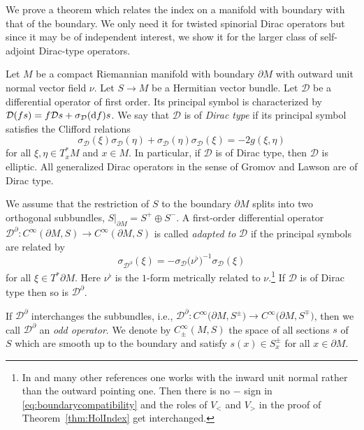 \documentclass[11pt]{article}
\numberwithin{equation}{section}
\numberwithin{equation}{section}
\begin{document}
We prove a theorem which relates the index on a manifold with boundary with that of the boundary.
We only need it for twisted spinorial Dirac operators but since it may be of independent interest, we show it for the larger class of self-adjoint Dirac-type operators.

Let $M$ be a compact Riemannian manifold with boundary $\partial M$ with outward unit normal vector field $\nu$.
Let $S \to M$ be a Hermitian vector bundle.
Let $\mathcal{D}$ be a differential operator of first order.
Its principal symbol is characterized by $\mathcal{D}(fs)=f\mathcal{D}s+\sigma_{\mathcal{D}}({\rm d}f)s$.
We say that $\mathcal{D}$ is of \emph{Dirac type} if its principal symbol satisfies the Clifford relations
\[
\sigma_{\mathcal{D}}(\xi)\sigma_{\mathcal{D}}(\eta) + \sigma_{\mathcal{D}}(\eta)\sigma_{\mathcal{D}}(\xi) = -2g(\xi,\eta)
\]
for all $\xi,\eta\in T^*_xM$ and $x\in M$.
In particular, if $\mathcal{D}$ is of Dirac type, then $\mathcal{D}$ is elliptic.
All generalized Dirac operators in the sense of Gromov and Lawson are of Dirac type.

We assume that the restriction of $S$ to the boundary $\partial M$ splits into two orthogonal subbundles, $S|_{\partial M} = S^+\oplus S^-$.
A first-order differential operator $\mathcal{D}^\partial\colon C^\infty(\partial M, S) \to C^\infty(\partial M, S)$ is called \emph{adapted to} $\mathcal{D}$ if the principal symbols are related by
\begin{equation}
\sigma_{\mathcal{D}^\partial}(\xi)=-\sigma_{\mathcal{D}}\big(\nu^\flat\big)^{-1}\sigma_{\mathcal{D}}(\xi)
\label{eq:boundarycompatibility}
\end{equation}
for all $\xi\in T^*\partial M$.
Here $\nu^\flat$ is the $1$-form metrically related to $\nu$.\footnote{In \cite{Baer-Ballmann} and many other references one works with the inward unit normal rather than the outward pointing one. Then there is no $-$ sign in \eqref{eq:boundarycompatibility} and the roles of $V_<$ and $V_>$ in the proof of Theorem~\ref{thm:HolIndex} get interchanged.}
If $\mathcal{D}$ is of Dirac type then so is $\mathcal{D}^\partial$.

If $\mathcal{D}^\partial$ interchanges the subbundles, i.e., $\mathcal{D}^\partial\colon C^\infty\big(\partial M, S^\pm\big) \to C^\infty\big(\partial M, S^\mp\big)$, then we call $\mathcal{D}^\partial$ an \emph{odd operator}.
We denote by $C^\infty_\pm(M,S)$ the space of all sections $s$ of $S$ which are smooth up to the boundary and satisfy $s(x)\in S^\pm_x$ for all $x\in\partial M$.
\end{document}
